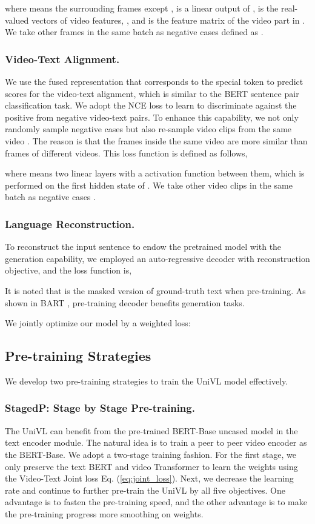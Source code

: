 \documentclass[11pt,a4paper]{article}
\begin{document}
	where  means the surrounding frames except ,  is a linear output of ,  is the real-valued vectors of video features, , and  is the feature matrix of the video part in . We take other frames in the same batch as negative cases defined as .
	
	\subsubsection{Video-Text Alignment.} 
	We use the fused representation that corresponds to the special token  to predict scores for the video-text alignment, which is similar to the BERT sentence pair classification task. We adopt the NCE loss to learn to discriminate against the positive from negative video-text pairs. To enhance this capability, we not only randomly sample negative cases but also re-sample video clips from the same video \cite{han2019video}. The reason is that the frames inside the same video are more similar than frames of different videos. This loss function is defined as follows,
	
	where  means two linear layers with a  activation function between them, which is performed on the first hidden state of . We take other video clips in the same batch  as negative cases .
	
	\subsubsection{Language Reconstruction.} 
	To reconstruct the input sentence to endow the pretrained model with the generation capability, we employed an auto-regressive decoder with reconstruction objective, and the loss function is,
	
	It is noted that  is the masked version of ground-truth text  when pre-training. As shown in BART \cite{lewis2019bart}, pre-training decoder benefits generation tasks. 
	
	We jointly optimize our model by a weighted loss:
	
	
	\subsection{Pre-training Strategies}
	We develop two pre-training strategies to train the UniVL model effectively.
	
	\subsubsection{StagedP: Stage by Stage Pre-training.} The UniVL can benefit from the pre-trained BERT-Base uncased model in the text encoder module. The natural idea is to train a peer to peer video encoder as the BERT-Base. We adopt a two-stage training fashion. For the first stage, we only preserve the text BERT and video Transformer to learn the weights using the Video-Text Joint loss Eq. (\ref{eq:joint_loss}). Next, we decrease the learning rate and continue to further pre-train the UniVL by all five objectives. One advantage is to fasten the pre-training speed, and the other advantage is to make the pre-training progress more smoothing on weights.
	
\end{document}
